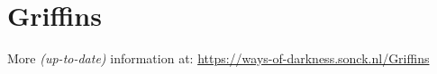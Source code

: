 \section{Griffins}
More \textit{(up-to-date)} information at: \url{https://ways-of-darkness.sonck.nl/Griffins}


